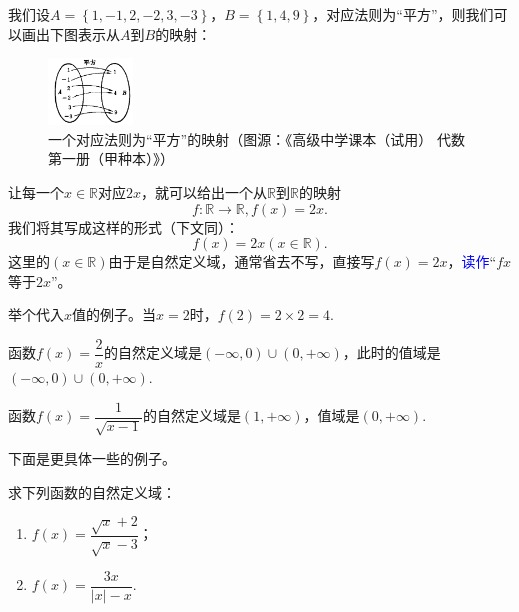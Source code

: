 \documentclass[lang=cn,math=cm,chinesefont=nofont,11pt,scheme=chinese,twocol]{elegantbook}
\begin{document}
\begin{example}
  我们设$A=\left\{1,-1,2,-2,3,-3\right\}$，$B=\left\{1,4,9\right\}$，对应法则为“平方”，则我们可以画出下图表示从$A$到$B$的映射：
\end{example}

\begin{figure}[h]
  \centering
  \includegraphics[width=0.2\textwidth]{image/map2.1.1.png}
  \caption{一个对应法则为“平方”的映射（图源：《高级中学课本（试用） 代数 第一册（甲种本）》）}
  \label{img:map1}
\end{figure}

\begin{example}\label{MapExample2}
  让每一个$x\in\mathbb{R}$对应$2x$，就可以给出一个从$\mathbb{R}$到$\mathbb{R}$的映射$$f:\mathbb{R}\rightarrow\mathbb{R},f(x)=2x.$$我们将其写成这样的形式（下文同）：$$f(x)=2x(x\in\mathbb{R}).$$这里的$(x\in\mathbb{R})$由于是自然定义域，通常省去不写，直接写$f(x)=2x$，\textcolor{blue}{读作}“$fx$等于$2x$”。

  举个代入$x$值的例子。当$x=2$时，$f(2)=2\times 2=4$.
\end{example}

\begin{spacing}{2.0}
  \begin{example}
    函数$f(x)=\dfrac{2}{x}$的自然定义域是$(-\infty,0)\cup(0,+\infty)$，此时的值域是$(-\infty,0)\cup(0,+\infty)$.
  \end{example}
  
  \begin{example}
    函数$f(x)=\dfrac{1}{\sqrt{x-1}}$的自然定义域是$(1,+\infty)$，值域是$(0,+\infty)$.
  \end{example}
  
  下面是更具体一些的例子。
  
  \begin{example}
    求下列函数的自然定义域：
  \end{example}
  
  \begin{enumerate}
    \item $f(x)=\dfrac{\sqrt{x}+2}{\sqrt{x}-3}$；
    \item $f(x)=\dfrac{3x}{\left| x \right|-x}$.
  \end{enumerate}
\end{spacing}
\end{document}
